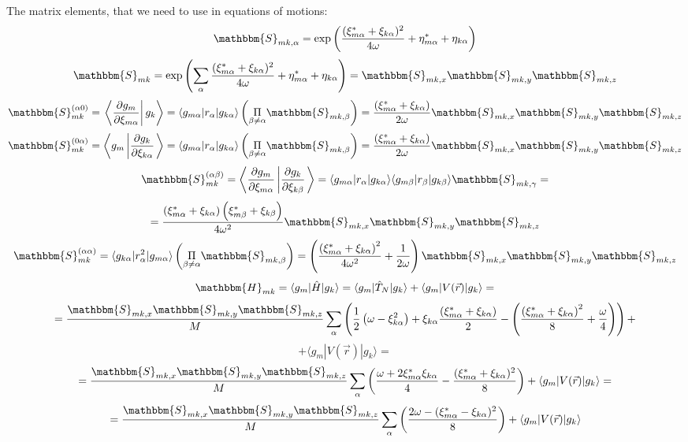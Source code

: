 The matrix elements, that we need to use in equations of motions:
$$\mathbbm{S}_{mk,\alpha}=\text{exp}\left(\frac{(\xi_{m\alpha}^*+\xi_{k\alpha})^2}{4\omega}+\eta_{m\alpha}^*+\eta_{k\alpha} \right)$$
$$\mathbbm{S}_{mk} = \text{exp}\left(\sum_{\alpha} \frac{(\xi_{m\alpha}^*+\xi_{k\alpha})^2}{4\omega}+\eta_{m\alpha}^*+\eta_{k\alpha}\right)=%
  \mathbbm{S}_{mk,x}\mathbbm{S}_{mk,y}\mathbbm{S}_{mk,z}$$
$$\mathbbm{S}_{mk}^{(\alpha0)}=\left.\left\langle\frac{\partial g_m}{\partial\xi_{m\alpha}}\right|g_k\right\rangle=%
  \langle g_{m\alpha}|r_{\alpha}|g_{k\alpha}\rangle\left(\underset{\beta\neq\alpha}{\Pi}\mathbbm{S}_{mk,\beta}\right)=%
  \frac{\left(\xi_{m\alpha}^*+\xi_{k\alpha}\right)}{2\omega}\mathbbm{S}_{mk,x}\mathbbm{S}_{mk,y}\mathbbm{S}_{mk,z}$$
$$\mathbbm{S}_{mk}^{(0\alpha)}=\left\langle g_m\left|\frac{\partial g_k}{\partial\xi_{k\alpha}}\right.\right\rangle=%
  \langle g_{m\alpha}|r_{\alpha}|g_{k\alpha}\rangle\left(\underset{\beta\neq\alpha}{\Pi}\mathbbm{S}_{mk,\beta}\right)=%
  \frac{\left(\xi_{m\alpha}^*+\xi_{k\alpha}\right)}{2\omega}\mathbbm{S}_{mk,x}\mathbbm{S}_{mk,y}\mathbbm{S}_{mk,z}$$
$$\mathbbm{S}_{mk}^{(\alpha\beta)}=\left\langle\frac{\partial g_m}{\partial\xi_{m\alpha}}\left|\frac{\partial g_k}{\partial\xi_{k\beta}}\right.\right\rangle=%
  \langle g_{m\alpha}|r_{\alpha}|g_{k\alpha}\rangle\langle g_{m\beta}|r_{\beta}|g_{k\beta}\rangle\mathbbm{S}_{mk,\gamma}=$$
$$=\frac{\left(\xi_{m\alpha}^*+\xi_{k\alpha}\right)\left(\xi_{m\beta}^*+\xi_{k\beta}\right)}{4\omega^2}\mathbbm{S}_{mk,x}\mathbbm{S}_{mk,y}\mathbbm{S}_{mk,z}$$
$$\mathbbm{S}_{mk}^{(\alpha\alpha)}=\langle g_{k\alpha}|r_{\alpha}^2|g_{m\alpha}\rangle\left(\underset{\beta\neq\alpha}{\Pi}\mathbbm{S}_{mk,\beta}\right)=%
  \left(\frac{\left(\xi_{m\alpha}^*+\xi_{k\alpha}\right)^2}{4\omega^2}+\frac{1}{2\omega}\right)\mathbbm{S}_{mk,x}\mathbbm{S}_{mk,y}\mathbbm{S}_{mk,z}$$
$$\mathbbm{H}_{mk}=\langle g_m|\hat{H}|g_k\rangle=\langle g_m|\hat{T}_N|g_k\rangle+\langle g_m|V(\vec{r})|g_k\rangle=$$
$$=\frac{\mathbbm{S}_{mk,x}\mathbbm{S}_{mk,y}\mathbbm{S}_{mk,z}}{M}%
		       \sum_{\alpha}\left( \frac{1}{2}\left(\omega-\xi_{k\alpha}^2\right)+%
		       \xi_{k\alpha}\frac{\left(\xi_{m\alpha}^*+\xi_{k\alpha}\right)}{2}-%
		       \left(\frac{\left(\xi_{m\alpha}^*+\xi_{k\alpha}\right)^2}{8}+\frac{\omega}{4}\right)\right)+$$
$$+\langle g_m|V(\vec{r})|g_k\rangle=$$
$$=\frac{\mathbbm{S}_{mk,x}\mathbbm{S}_{mk,y}\mathbbm{S}_{mk,z}}{M}%
   \sum_{\alpha}\left(\frac{\omega+2\xi_{m\alpha}^*\xi_{k\alpha}}{4}-\frac{(\xi_{m\alpha}^*+\xi_{k\alpha})^2}{8} \right)+\langle g_m|V(\vec{r})|g_k\rangle=$$
$$=\frac{\mathbbm{S}_{mk,x}\mathbbm{S}_{mk,y}\mathbbm{S}_{mk,z}}{M}%
   \sum_{\alpha}\left(\frac{2\omega-(\xi_{m\alpha}^*-\xi_{k\alpha})^2}{8} \right)+\langle g_m|V(\vec{r})|g_k\rangle$$

